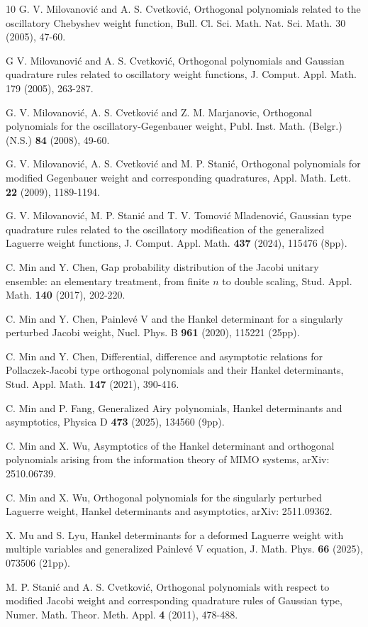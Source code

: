 \documentclass[11pt,a4paper]{article}
\numberwithin{equation}{section}
\begin{document}
\begin{thebibliography}{10}
G. V. Milovanovi\'c and A. S. Cvetkovi\'c,  Orthogonal polynomials related to the oscillatory Chebyshev weight function, {Bull. Cl. Sci. Math. Nat. Sci. Math. 30 (2005)}, {47-60}.


G V. Milovanovi\'c and A. S. Cvetkovi\'c, Orthogonal polynomials and Gaussian quadrature rules related to oscillatory weight functions, J. Comput. Appl. Math. 179 (2005), 263-287.


G. V. Milovanovi\'{c}, A. S. Cvetkovi\'{c} and Z. M. Marjanovic, Orthogonal polynomials for the oscillatory-Gegenbauer weight, Publ. Inst. Math. (Belgr.) (N.S.) {\bf 84} (2008), 49-60.


G. V. Milovanovi\'{c}, A. S. Cvetkovi\'{c} and M. P. Stani\'{c}, Orthogonal polynomials for modified Gegenbauer weight and corresponding quadratures, Appl. Math. Lett. {\bf 22} (2009), 1189-1194.


G. V. Milovanovi\'{c}, M. P. Stani\'{c} and T. V. Tomovi\'{c} Mladenovi\'{c}, Gaussian type quadrature rules related to the oscillatory modification of the generalized Laguerre weight functions, J. Comput. Appl. Math. {\bf 437} (2024), 115476 (8pp).

C. Min and Y. Chen, Gap probability distribution of the Jacobi unitary ensemble: an elementary treatment, from finite $n$ to double scaling, Stud. Appl. Math. {\bf 140} (2017), 202-220.

C. Min and Y. Chen, Painlev\'{e} V and the Hankel determinant for a singularly perturbed Jacobi weight, Nucl. Phys. B {\bf 961} (2020), 115221 (25pp).

C. Min and Y. Chen, Differential, difference and asymptotic relations for Pollaczek-Jacobi type orthogonal polynomials and their Hankel determinants, Stud. Appl. Math. {\bf 147} (2021), 390-416.


C. Min and P. Fang, Generalized Airy polynomials, Hankel determinants and asymptotics, Physica D {\bf 473} (2025), 134560 (9pp).


C. Min and X. Wu, Asymptotics of the Hankel determinant and orthogonal polynomials arising from the information theory of MIMO systems, arXiv: 2510.06739.


C. Min and X. Wu, Orthogonal polynomials for the singularly perturbed Laguerre weight, Hankel determinants and asymptotics, arXiv: 2511.09362.


X. Mu and S. Lyu, Hankel determinants for a deformed Laguerre weight with multiple variables and generalized Painlev\'{e} V equation, J. Math. Phys. {\bf 66} (2025), 073506 (21pp).


M. P. Stani\'{c} and A. S. Cvetkovi\'{c}, Orthogonal polynomials with respect to modified
Jacobi weight and corresponding quadrature rules
of Gaussian type, Numer. Math. Theor. Meth. Appl. {\bf 4} (2011), 478-488.


\end{thebibliography}
\end{document}
